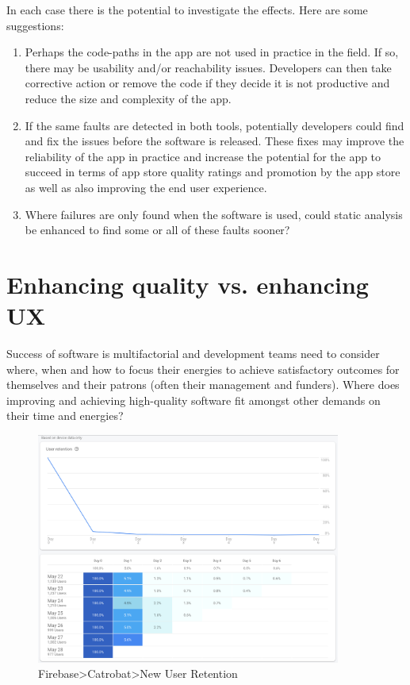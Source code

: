 In each case there is the potential to investigate the effects. Here are some suggestions:
\begin{enumerate}
    \item Perhaps the code-paths in the app are not used in practice in the field. If so, there may be usability and/or reachability issues. Developers can then take corrective action or remove the code if they decide it is not productive and reduce the size and complexity of the app.
    \item If the same faults are detected in both tools, potentially developers could find and fix the issues before the software is released. These fixes may improve the reliability of the app in practice and increase the potential for the app to succeed in terms of app store quality ratings and promotion by the app store as well as also improving the end user experience.
    \item Where failures are only found when the software is used, could static analysis be enhanced to find some or all of these faults sooner?
\end{enumerate}

\section{Enhancing quality vs. enhancing UX}\label{enhancing-quality-vs-enhancing-ux}
Success of software is multifactorial and development teams need to consider where, when and how to focus their energies to achieve satisfactory outcomes for themselves and their patrons (often their management and funders). Where does improving and achieving high-quality software fit amongst other demands on their time and energies?

\begin{figure}[htbp!]
    \centering
    \includegraphics[width=10cm]{images/firebase/Firebase-pocketcode-android-7-day-new-user-retention-29-may-2020.png}
    \caption{Firebase>Catrobat>New User Retention}
    \label{fig:Firebase-pocketcode-android-7-day-new-user-retention-29-may-2020}
\end{figure}

